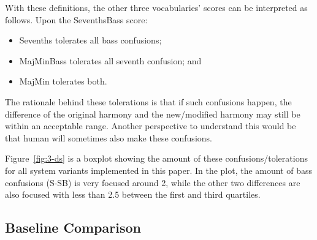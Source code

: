 With these definitions, the other three vocabularies' scores can be interpreted as follows. Upon the SeventhsBass score:
\begin{itemize}
	\item Sevenths tolerates all bass confusions;
	\item MajMinBass tolerates all seventh confusion; and
	\item MajMin tolerates both.
\end{itemize}
The rationale behind these tolerations is that if such confusions happen, the difference of the original harmony and the new/modified harmony may still be within an acceptable range. Another perspective to understand this would be that human will sometimes also make these confusions.

Figure~\ref{fig:3-ds} is a boxplot showing the amount of these confusions/tolerations for all system variants implemented in this paper. In the plot, the amount of bass confusions (S-SB) is very focused around 2, while the other two differences are also focused with less than 2.5 between the first and third quartiles.

\subsection{Baseline Comparison} \label{sec:3-p9}

